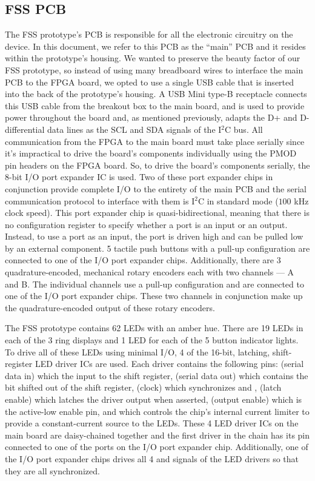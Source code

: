 \documentclass[conference]{IEEEtran}
\begin{document}
\subsection{FSS PCB}
The FSS prototype's PCB is responsible for all the electronic circuitry on the device. In this document, we refer to this PCB as the ``main'' PCB and it resides within the prototype's housing. We wanted to preserve the beauty factor of our FSS prototype, so instead of using many breadboard wires to interface the main PCB to the FPGA board, we opted to use a single USB cable that is inserted into the back of the prototype's housing. A USB Mini type-B receptacle connects this USB cable from the breakout box to the main board, and is used to provide power throughout the board and, as mentioned previously, adapts the D+ and D- differential data lines as the SCL and SDA signals of the I$^2$C bus. All communication from the FPGA to the main board must take place serially since it's impractical to drive the board's components individually using the PMOD pin headers on the FPGA board. So, to drive the board's components serially, the  8-bit I/O port expander IC is used. Two of these port expander chips in conjunction provide complete I/O to the entirety of the main PCB and the serial communication protocol to interface with them is I$^2$C in standard mode ($100$ kHz clock speed). This port expander chip is quasi-bidirectional, meaning that there is no configuration register to specify whether a port is an input or an output. Instead, to use a port as an input, the port is driven high and can be pulled low by an external component. 5 tactile push buttons with a pull-up configuration are connected to one of the I/O port expander chips. Additionally, there are 3 quadrature-encoded, mechanical rotary encoders each with two channels --- A and B. The individual channels use a pull-up configuration and are connected to one of the I/O port expander chips. These two channels in conjunction make up the quadrature-encoded output of these rotary encoders.

The FSS prototype contains 62 LEDs with an amber hue. There are 19 LEDs in each of the 3 ring displays and 1 LED for each of the 5 button indicator lights. To drive all of these LEDs using minimal I/O, 4 of the  16-bit, latching, shift-register LED driver ICs are used. Each driver contains the following pins:  (serial data in) which the input to the shift register,  (serial data out) which contains the bit shifted out of the shift register,  (clock) which synchronizes  and ,  (latch enable) which latches the driver output when asserted,  (output enable) which is the active-low enable pin, and  which controls the chip's internal current limiter to provide a constant-current source to the LEDs. These 4 LED driver ICs on the main board are daisy-chained together and the first driver in the chain has its  pin connected to one of the ports on the I/O port expander chip. Additionally, one of the I/O port expander chips drives all 4  and  signals of the LED drivers so that they are all synchronized.
\end{document}
